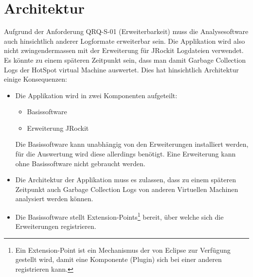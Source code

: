 \section{Architektur}\label{konzept_uebersicht}
Aufgrund der Anforderung QRQ-S-01 (Erweiterbarkeit) muss die Analysesoftware auch hinsichtlich anderer Logformate erweiterbar sein. Die Applikation wird also nicht zwingendermassen mit der Erweiterung für JRockit Logdateien verwendet. Es könnte zu einem späteren Zeitpunkt sein, dass man damit Garbage Collection Logs der HotSpot virtual Machine auswertet. Dies hat hinsichtlich Architektur einige Konsequenzen:
\begin{itemize}
	\item Die Applikation wird in zwei Komponenten aufgeteilt:
		\begin{itemize}
			\item Basissoftware
			\item Erweiterung JRockit
		\end{itemize}
		Die Basissoftware kann unabhängig von den Erweiterungen installiert werden, für die Auswertung wird diese allerdings benötigt. Eine Erweiterung kann ohne Basissoftware nicht gebraucht werden.
	\item Die Architektur der Applikation muss es zulassen, dass zu einem späteren Zeitpunkt auch Garbage Collection Logs von anderen Virtuellen Machinen analysiert werden können.
	\item Die Basissoftware stellt Extension-Points\footnote{Ein Extension-Point ist ein Mechanismus der von Eclipse zur Verfügung gestellt wird, damit eine Komponente (Plugin) sich bei einer anderen registrieren kann.} bereit, über welche sich die Erweiterungen  registrieren.
\end{itemize}

